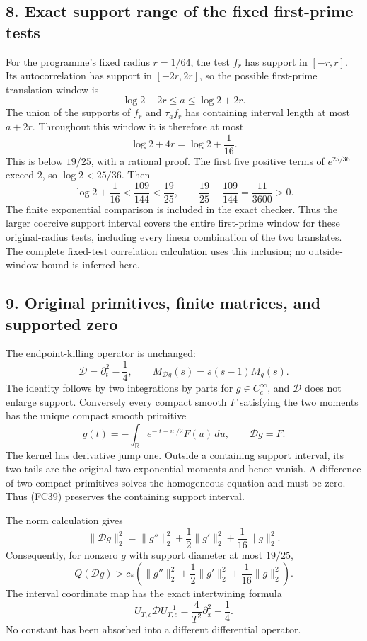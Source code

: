 \documentclass[
  10pt,
  a4paper,
]{article}
\begin{document}
\subsection{8. Exact support range of the fixed first-prime
tests}\label{exact-support-range-of-the-fixed-first-prime-tests}

For the programme's fixed radius \(r=1/64\), the test \(f_r\) has
support in \([-r,r]\). Its autocorrelation has support in \([-2r,2r]\),
so the possible first-prime translation window is \[
\log2-2r\le a\le\log2+2r.
\] The union of the supports of \(f_r\) and \(\tau_af_r\) has containing
interval length at most \(a+2r\). Throughout this window it is therefore
at most \[
\log2+4r=\log2+\frac1{16}.
\tag{FC36}
\] This is below \(19/25\), with a rational proof. The first five
positive terms of \(e^{25/36}\) exceed \(2\), so \(\log2<25/36\). Then
\[
\log2+\frac1{16}<\frac{109}{144}<\frac{19}{25},
\qquad \frac{19}{25}-\frac{109}{144}=\frac{11}{3600}>0.
\tag{FC37}
\] The finite exponential comparison is included in the exact checker.
Thus the larger coercive support interval covers the entire first-prime
window for these original-radius tests, including every linear
combination of the two translates. The complete fixed-test correlation
calculation uses this inclusion; no outside-window bound is inferred
here.

\subsection{9. Original primitives, finite matrices, and supported
zero}\label{original-primitives-finite-matrices-and-supported-zero}

The endpoint-killing operator is unchanged: \[
\mathcal D=\partial_t^2-\frac14,\qquad
M_{\mathcal Dg}(s)=s(s-1)M_g(s).
\tag{FC38}
\] The identity follows by two integrations by parts for
\(g\in C_c^\infty\), and \(\mathcal D\) does not enlarge support.
Conversely every compact smooth \(F\) satisfying the two moments has the
unique compact smooth primitive \[
g(t)=-\int_{\mathbb R}e^{-|t-u|/2}F(u)\,du,\qquad
\mathcal Dg=F.
\tag{FC39}
\] The kernel has derivative jump one. Outside a containing support
interval, its two tails are the original two exponential moments and
hence vanish. A difference of two compact primitives solves the
homogeneous equation and must be zero. Thus (FC39) preserves the
containing support interval.

The norm calculation gives \[
\|\mathcal Dg\|_2^2=
\|g''\|_2^2+\frac12\|g'\|_2^2+\frac1{16}\|g\|_2^2.
\] Consequently, for nonzero \(g\) with support diameter at most
\(19/25\), \[
Q(\mathcal Dg)>
c_*\left(\|g''\|_2^2+\frac12\|g'\|_2^2+\frac1{16}\|g\|_2^2\right).
\tag{FC40}
\] The interval coordinate map has the exact intertwining formula \[
U_{T,c}\mathcal D U_{T,c}^{-1}
=\frac4{T^2}\partial_x^2-\frac14.
\tag{FC41}
\] No constant has been absorbed into a different differential operator.
\end{document}
